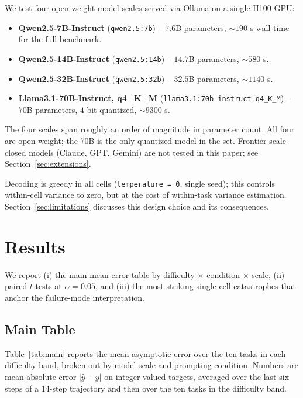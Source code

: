 \documentclass[11pt]{article}
\begin{document}
We test four open-weight model scales served via Ollama on a
single H100 GPU:
\begin{itemize}[leftmargin=2em,itemsep=0pt,topsep=2pt]
\item \textbf{Qwen2.5-7B-Instruct} (\texttt{qwen2.5:7b}) -- $7.6$B
  parameters, $\sim 190$ s wall-time for the full benchmark.
\item \textbf{Qwen2.5-14B-Instruct} (\texttt{qwen2.5:14b}) --
  $14.7$B parameters, $\sim 580$ s.
\item \textbf{Qwen2.5-32B-Instruct} (\texttt{qwen2.5:32b}) --
  $32.5$B parameters, $\sim 1140$ s.
\item \textbf{Llama3.1-70B-Instruct, q4\_K\_M}
  (\texttt{llama3.1:70b-instruct-q4\_K\_M}) -- $70$B parameters,
  $4$-bit quantized, $\sim 9300$ s.
\end{itemize}
The four scales span roughly an order of magnitude in parameter
count.  All four are open-weight; the 70B is the only quantized
model in the set.  Frontier-scale closed models (Claude, GPT, Gemini)
are not tested in this paper; see Section~\ref{sec:extensions}.

Decoding is greedy in all cells (\verb|temperature = 0|, single
seed); this controls within-cell variance to zero, but at the cost
of within-task variance estimation.  Section~\ref{sec:limitations}
discusses this design choice and its consequences.

\section{Results}
\label{sec:results}

We report (i) the main mean-error table by difficulty $\times$
condition $\times$ scale, (ii) paired $t$-tests at $\alpha = 0.05$,
and (iii) the most-striking single-cell catastrophes that anchor
the failure-mode interpretation.

\subsection{Main Table}

Table~\ref{tab:main} reports the mean asymptotic error over the
ten tasks in each difficulty band, broken out by model scale and
prompting condition.  Numbers are mean
absolute error $|\hat y - y|$ on integer-valued targets, averaged
over the last six steps of a 14-step trajectory and then over the
ten tasks in the difficulty band.
\end{document}
